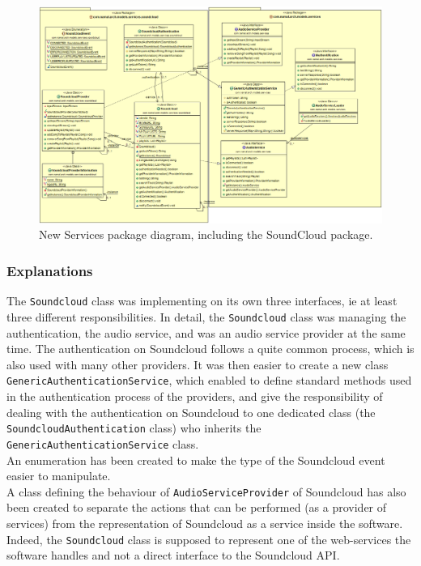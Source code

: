 \documentclass{report}
\begin{document}
{{\begin{figure}[H]

  \includegraphics[scale=0.4]{class/Services2.png}
  \caption{New Services package diagram, including the SoundCloud package.}
  \label{UpdateServices}
\end{figure}
}

\subsubsection{Explanations}
The \texttt{Soundcloud} class was implementing on its own three interfaces, ie at least three different responsibilities. In detail, the \texttt{Soundcloud} class was managing the authentication, the audio service, and was an audio service provider at the same time. The authentication on Soundcloud follows a quite common process, which is also used with many other providers. It was then easier to create a new class \texttt{GenericAuthenticationService}, which enabled to define standard methods used in the authentication process of the providers, and give the responsibility of dealing with the authentication on Soundcloud to one dedicated class (the \texttt{SoundcloudAuthentication} class) who inherits the \texttt{GenericAuthenticationService} class. \\
An enumeration has been created to make the type of the Soundcloud event easier to manipulate.\\
A class defining the behaviour of \texttt{AudioServiceProvider} of Soundcloud has also been created to separate the actions that can be performed (as a provider of services) from  the representation of Soundcloud as a service inside the software. Indeed, the \texttt{Soundcloud} class is supposed to represent one of the web-services the software handles and not a direct interface to the Soundcloud API.

}
\end{document}
